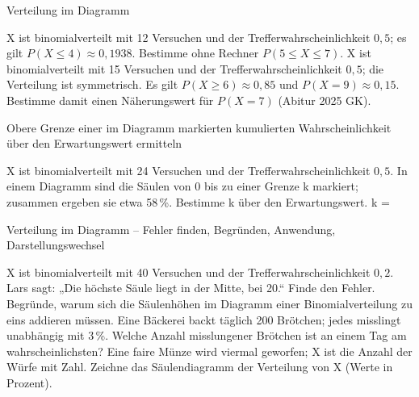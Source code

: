 \begin{aufgabe}{Verteilung im Diagramm}
\begin{teile}
\leerfeld
\teil X ist binomialverteilt mit 12 Versuchen und der Trefferwahrscheinlichkeit $0{,}5$; es gilt $P(X \le 4) \approx 0{,}1938$. Bestimme ohne Rechner $P(5 \le X \le 7)$. \leerfeld
\teil X ist binomialverteilt mit 15 Versuchen und der Trefferwahrscheinlichkeit $0{,}5$; die Verteilung ist symmetrisch. Es gilt $P(X \ge 6) \approx 0{,}85$ und $P(X = 9) \approx 0{,}15$. Bestimme damit einen Näherungswert für $P(X = 7)$ \hfill (Abitur 2025 GK). \leerfeld
\end{teile}
\end{aufgabe}

\begin{aufgabe}{Obere Grenze einer im Diagramm markierten kumulierten Wahrscheinlichkeit über den Erwartungswert ermitteln}
\begin{teile}
\teil X ist binomialverteilt mit 24 Versuchen und der Trefferwahrscheinlichkeit $0{,}5$. In einem Diagramm sind die Säulen von 0 bis zu einer Grenze k markiert; zusammen ergeben sie etwa 58\,\%. Bestimme k über den Erwartungswert. k = \leerfeld
\end{teile}
\end{aufgabe}

\begin{aufgabe}{Verteilung im Diagramm – Fehler finden, Begründen, Anwendung, Darstellungswechsel}
\begin{teile}
\teil X ist binomialverteilt mit 40 Versuchen und der Trefferwahrscheinlichkeit $0{,}2$. Lars sagt: „Die höchste Säule liegt in der Mitte, bei 20.“ Finde den Fehler.
\teil Begründe, warum sich die Säulenhöhen im Diagramm einer Binomialverteilung zu eins addieren müssen.
\teil Eine Bäckerei backt täglich 200 Brötchen; jedes misslingt unabhängig mit 3\,\%. Welche Anzahl misslungener Brötchen ist an einem Tag am wahrscheinlichsten?
\teil Eine faire Münze wird viermal geworfen; X ist die Anzahl der Würfe mit Zahl. Zeichne das Säulendiagramm der Verteilung von X (Werte in Prozent).

\end{teile}
\end{aufgabe}
